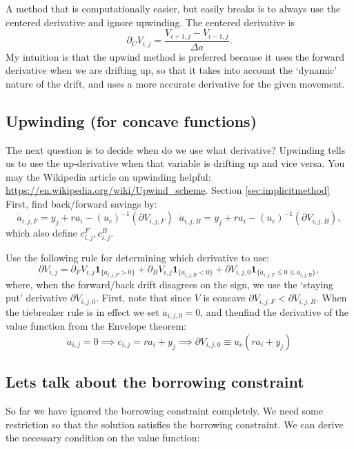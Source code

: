 \documentclass[12pt]{article}
\DeclareMathOperator{\1}{\mathbbm{1}}
\begin{document}
A method that is computationally easier, but easily breaks is to always use the centered derivative and ignore upwinding. The centered derivative is
\begin{equation*}
    \partial_{C}V_{i,j}=\frac{V_{i+1,j}-V_{i-1,j}}{\Delta a}.
\end{equation*}
My intuition is that the upwind method is preferred because it uses the forward derivative when we are drifting up, so that it takes into account the `dynamic' nature of the drift, and uses a more accurate derivative for the given movement.
    
    \subsection{Upwinding (for concave functions)}
    The next question is to decide when do we use what derivative? Upwinding tells us to use the up-derivative when that variable is drifting up and vice versa. You may the Wikipedia article on upwinding helpful: \url{https://en.wikipedia.org/wiki/Upwind_scheme}. Section \ref{sec:implicitmethod} First, find back/forward savings by:
    \begin{equation}
    \dot a_{i,j,F} = y_j + r a_i -(u_c)^{-1}(\partial V_{i,j,F}) \;\;     \dot a_{i,j,B} = y_j + r a_i -(u_c)^{-1}(\partial V_{i,j,B}),
    \end{equation}
    which also define $c_{i,j}^F,c_{i,j}^B$. 
    
    Use the following rule for determining which derivative to use:
    \begin{equation}\label{eq:upwind}
    \partial V_{i,j}=\partial_F V_{i,j}\mathbf{1}_{\{\dot a_{i,j,F}>0\}} + \partial_B V_{i,j}\mathbf{1}_{\{\dot a_{i,j,B}<0\}} +  {\partial V_{i,j,0}}\mathbf{1}_{\{\dot a_{i,j,F}\le 0 \le \dot a_{i,j,B}\}},
    \end{equation}
    where, when the forward/back drift disagrees on the sign, we use the `staying put' derivative $\partial V_{i,j,0}$. First, note that since $V$ is concave $\partial V_{i,j,F}<\partial V_{i,j,B}$. When the tiebreaker rule is in effect we set $\dot a_{i,j,0}=0$, and thenfind the derivative of the value function from the Envelope theorem: \begin{equation}
    \dot a_{i,j} = 0 \implies c_{i,j} = r a_i + y_j \implies \partial    V_{i,j,0} \equiv u_c(r a_i+y_j)  
    \end{equation}
    
    \subsection{Lets talk about the borrowing constraint}
    \label{sec:borrowingconstr}
So far we have ignored the borrowing constraint completely. We need some restriction so that the solution satisfies the borrowing constraint. We can derive the necessary condition on the value function:
\end{document}
